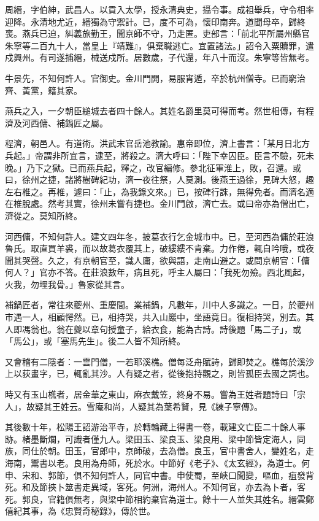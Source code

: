\begin{pinyinscope}
周縉，字伯紳，武昌人。以貢入太學，授永清典史，攝令事。成祖舉兵，守令相率迎降。永清地尤近，縉獨為守禦計。已，度不可為，懷印南奔。道聞母卒，歸終喪。燕兵已迫，糾義旅勤王，聞京師不守，乃走匿。吏部言：「前北平所屬州縣官朱寧等二百九十人，當皇上『靖難』，俱棄職逃亡。宜置諸法。」詔令入粟贖罪，遣戍興州。有司遂捕縉，械送戍所。居數歲，子代還，年八十而沒。朱寧等皆無考。

牛景先，不知何許人。官御史。金川門開，易服宵遁，卒於杭州僧寺。已而窮治齊、黃黨，籍其家。

燕兵之入，一夕朝臣縋城去者四十餘人。其姓名爵里莫可得而考。然世相傳，有程濟及河西傭、補鍋匠之屬。

程濟，朝邑人。有道術。洪武末官岳池教諭。惠帝即位，濟上書言：「某月日北方兵起。」帝謂非所宜言，逮至，將殺之。濟大呼曰：「陛下幸囚臣。臣言不驗，死未晚。」乃下之獄。已而燕兵起，釋之，改官編修。參北征軍淮上，敗，召還。或曰，徐州之捷，諸將樹碑紀功，濟一夜往祭，人莫測。後燕王過徐，見碑大怒，趣左右椎之。再椎，遽曰：「止，為我錄文來。」已，按碑行誅，無得免者。而濟名適在椎脫處。然考其實，徐州未嘗有捷也。金川門啟，濟亡去。或曰帝亦為僧出亡，濟從之。莫知所終。

河西傭，不知何許人。建文四年冬，披葛衣行乞金城市中。已，至河西為傭於莊浪魯氏。取直買羊裘，而以故葛衣覆其上，破縷縷不肯棄。力作倦，輒自吟哦，或夜聞其哭聲。久之，有京朝官至，識人庸，欲與語，走南山避之。或問京朝官：「傭何人？」官亦不答。在莊浪數年，病且死，呼主人屬曰：「我死勿殮。西北風起，火我，勿埋我骨。」魯家從其言。

補鍋匠者，常往來夔州、重慶間。業補鍋，凡數年，川中人多識之。一日，於夔州市遇一人，相顧愕然。已，相持哭，共入山巖中，坐語竟日。復相持哭，別去。其人即馮翁也。翁在夔以章句授童子，給衣食，能為古詩。詩後題「馬二子」，或「馬公」，或「塞馬先生」。後二人皆不知所終。

又會稽有二隱者：一雲門僧，一若耶溪樵。僧每泛舟賦詩，歸即焚之。樵每於溪沙上以荻畫字，已，輒亂其沙。人有疑之者，從後抱持觀之，則皆孤臣去國之詞也。

時又有玉山樵者，居金華之東山，麻衣戴笠，終身不易。嘗為王姓者題詩曰「宗人」，故疑其王姓云。雪庵和尚，人疑其為葉希賢，見《練子寧傳》。

其後數十年，松陽王詔游治平寺，於轉輪藏上得書一卷，載建文亡臣二十餘人事跡。楮墨斷爛，可識者僅九人。梁田玉、梁良玉、梁良用、梁中節皆定海人，同族，同仕於朝。田玉，官郎中，京師破，去為僧。良玉，官中書舍人，變姓名，走海南，鬻書以老。良用為舟師，死於水。中節好《老子》、《太玄經》，為道士。何申、宋和、郭節，俱不知何許人，同官中書。申使蜀，至峽口聞變，嘔血，疽發背死。和及節挾卜筮書走異域，客死。何洲，海州人。不知何官，亦去為卜者，客死。郭良，官籍俱無考，與梁中節相約棄官為道士。餘十一人並失其姓名。縉雲鄭僖紀其事，為《忠賢奇秘錄》，傳於世。


\end{pinyinscope}
